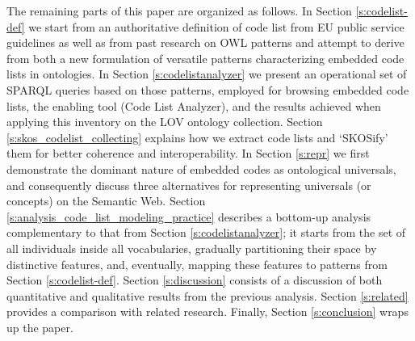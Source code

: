 The remaining parts of this paper are organized as follows. 
In Section \ref{s:codelist-def} we start from an authoritative definition of code list from EU public service guidelines as well as from past research on OWL patterns and attempt to derive from both a new formulation of versatile patterns characterizing embedded code lists in ontologies. 
In Section \ref{s:codelistanalyzer} we present an operational set of SPARQL queries based on those patterns, employed for browsing embedded code lists, the enabling tool (Code List Analyzer), and the results achieved when applying this inventory on the LOV ontology collection.
Section \ref{s:skos_codelist_collecting} explains how we extract code lists and `SKOSify' them for better coherence and interoperability.
In Section \ref{s:repr} we first demonstrate the dominant nature of embedded codes as ontological universals, and consequently discuss three alternatives for representing universals (or concepts) on the Semantic Web.
Section \ref{s:analysis_code_list_modeling_practice} describes a bottom-up analysis complementary to that from Section \ref{s:codelistanalyzer}; it starts from the set of all individuals inside all vocabularies, gradually partitioning their space by distinctive features, and, eventually, mapping these features to patterns from Section \ref{s:codelist-def}.
Section \ref{s:discussion} consists of a discussion of both quantitative and qualitative results from the previous analysis.
Section \ref{s:related} provides a comparison with related research.
Finally, Section \ref{s:conclusion} wraps up the paper.
